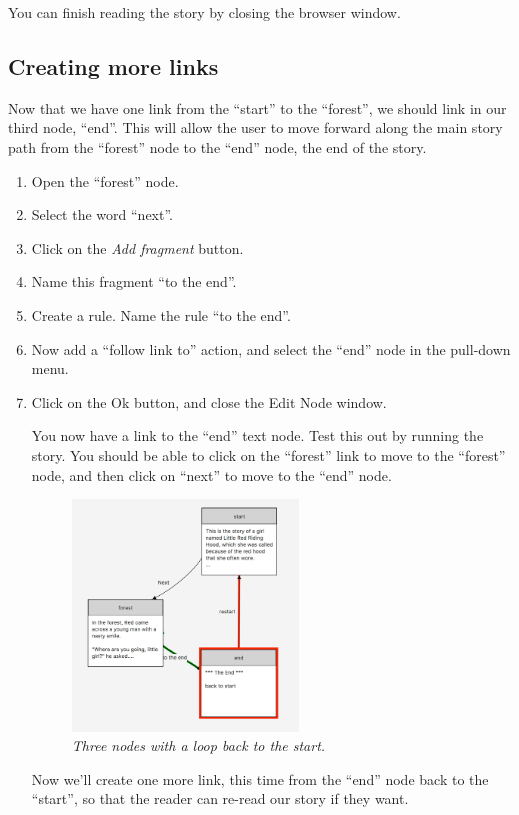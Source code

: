 \documentclass{article}
\begin{document}
You can finish reading the story by closing the browser window.

\subsection{Creating more links}

Now that we have one link from the ``start'' to the ``forest'', we should link in our third node, ``end''. This will allow the user to move forward along the main story path from the ``forest'' node to the ``end'' node, the end of the story.

\begin{enumerate}
\item Open the ``forest'' node.
\item Select the word ``next''.
\item Click on the \textit{Add fragment} button.
\item Name this fragment ``to the end''.
\item Create a rule. Name the rule ``to the end''.
\item Now add a ``follow link to'' action, and select the ``end'' node in the pull-down menu.
\item Click on the Ok button, and close the Edit Node window.

You now have a link to the ``end'' text node. Test this out by running
the story. You should be able to click on the ``forest'' link to move to the ``forest'' node, and then click on ``next'' to move to the ``end'' node.
 
\begin{figure}[ht]
  \centering
  \includegraphics[width=6cm]{images/hypedyn-tutorial-1-figure-11}
  \caption{\textit{Three nodes with a loop back to the start.}}
  \label{fig:tut1:three_nodes_and_links}
\end{figure} 

Now we'll create one more link, this time from the ``end'' node back to the ``start'', so that the reader can re-read our story if they want.


\end{enumerate}
\end{document}
